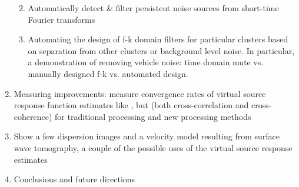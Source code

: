 \documentclass[11pt]{article}
\begin{document}
\begin{enumerate}
\begin{enumerate}
		\vspace{-0.2cm}
		\item Automatically detect \& filter persistent noise sources from short-time Fourier transforms
		\vspace{-0.2cm}
		\item Automating the design of f-k domain filters for particular clusters based on separation from other clusters or background level noise. In particular, a demonstration of removing vehicle noise: time domain mute vs. manually designed f-k vs. automated design. 
		\end{enumerate}
	\vspace{-0.2cm}
	\item Measuring improvements: measure convergence rates of virtual source response function estimates like \cite{Seats2012}, but  (both cross-correlation and cross-coherence) for traditional processing and new processing methods
	\vspace{-0.2cm}
	\item Show a few dispersion images and a velocity model resulting from surface wave tomography, a couple of the possible uses of the virtual source response estimates
	\vspace{-0.2cm}
	\item Conclusions and future directions
	\end{enumerate}











\end{document}

